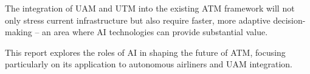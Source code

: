 The integration of \gls{UAM} and \gls{UTM} into the existing \gls{ATM} framework will not only stress current infrastructure but also require faster, more adaptive decision-making \cite{Rumba_2020} -- an area where \gls{AI} technologies can provide substantial value.

This report explores the roles of \gls{AI} in shaping the future of \gls{ATM}, focusing particularly on its application to autonomous airliners and \gls{UAM} integration.